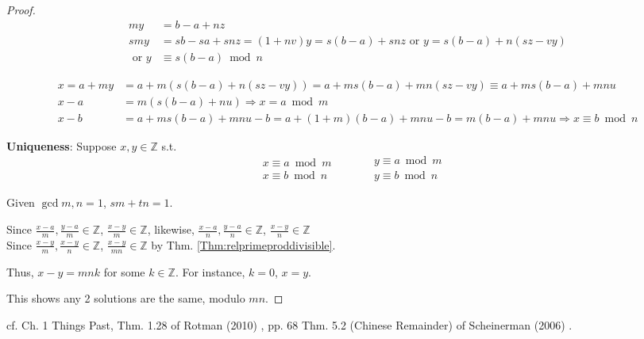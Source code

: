 \documentclass[10pt]{amsart}
\begin{document}
\begin{multicols*}{2}
\begin{proof}
\[
\begin{aligned}
my & = b-a+nz \\
smy & = sb - sa + snz = (1+nv) y = s(b-a) + snz \text{ or } y = s(b-a) + n(sz-vy) \\
\text{ or } y & \equiv s(b-a) \bmod{n}  
\end{aligned}\]

\[
\begin{aligned}
x = a+my & = a+m(s(b-a) + n(sz-vy)) = a+ ms(b-a) + mn(sz-vy) \equiv a+ms(b-a) + mnu \\ 
x-a & = m(s(b-a) + nu) \Longrightarrow x = a\bmod{m} \\
x-b & = a+ms(b-a) + mnu -b = a+(1+m)(b-a) + mnu -b = m(b-a) + mnu \Longrightarrow x \equiv b\bmod{n}
\end{aligned}
\]

\textbf{Uniqueness}:  
Suppose $x,y \in \mathbb{Z}$ s.t. 
\[
\begin{aligned} 
& x \equiv a \bmod{m} \\
& x \equiv b \bmod{n} \end{aligned} \qquad \  
\begin{aligned} 
& y \equiv a \bmod{m} \\
& y \equiv b \bmod{n} \end{aligned}
\]

Given $\gcd{m,n}=1$, $sm+tn=1$.  

Since $\frac{x-a}{m}, \frac{y-a}{m} \in \mathbb{Z}$, $\frac{x-y}{m} \in \mathbb{Z}$, likewise, $\frac{x-a}{n}, \frac{y-a}{n} \in \mathbb{Z}$, $\frac{x-y}{n} \in \mathbb{Z}$ \\
Since $\frac{x-y}{m}, \frac{x-y}{n} \in \mathbb{Z}$, $\frac{x-y}{mn} \in \mathbb{Z}$ by Thm. \ref{Thm:relprimeproddivisible}.  

Thus, $x-y = mn k$ for some $k\in \mathbb{Z}$.  For instance, $k=0$, $x=y$.  

This shows any 2 solutions are the same, modulo $mn$.  
\end{proof}


cf. Ch. 1 Things Past, Thm. 1.28 of Rotman (2010) \cite{JRotman2010}, pp. 68 Thm. 5.2 (Chinese Remainder) of Scheinerman (2006) \cite{Sche2006}.  





\end{multicols*}
\end{document}
